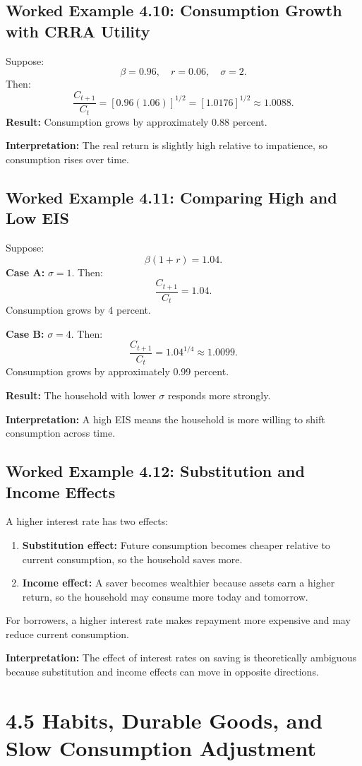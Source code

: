 \documentclass[12pt,a4paper]{article}
\begin{document}
\subsection*{Worked Example 4.10: Consumption Growth with CRRA Utility}
Suppose:
\[ \beta = 0.96, \quad r = 0.06, \quad \sigma = 2. \]
Then:
\[ \frac{C_{t+1}}{C_t} = [0.96(1.06)]^{1/2} = [1.0176]^{1/2} \approx 1.0088. \]
\textbf{Result:} Consumption grows by approximately 0.88 percent.

\textbf{Interpretation:} The real return is slightly high relative to impatience, so consumption rises over time.

\subsection*{Worked Example 4.11: Comparing High and Low EIS}
Suppose:
\[ \beta(1+r) = 1.04. \]
\textbf{Case A:} $\sigma = 1$. Then:
\[ \frac{C_{t+1}}{C_t} = 1.04. \]
Consumption grows by 4 percent.

\textbf{Case B:} $\sigma = 4$. Then:
\[ \frac{C_{t+1}}{C_t} = 1.04^{1/4} \approx 1.0099. \]
Consumption grows by approximately 0.99 percent.

\textbf{Result:} The household with lower $\sigma$ responds more strongly.

\textbf{Interpretation:} A high EIS means the household is more willing to shift consumption across time.

\subsection*{Worked Example 4.12: Substitution and Income Effects}
A higher interest rate has two effects:
\begin{enumerate}
    \item \textbf{Substitution effect:} Future consumption becomes cheaper relative to current consumption, so the household saves more.
    \item \textbf{Income effect:} A saver becomes wealthier because assets earn a higher return, so the household may consume more today and tomorrow.
\end{enumerate}
For borrowers, a higher interest rate makes repayment more expensive and may reduce current consumption.

\textbf{Interpretation:} The effect of interest rates on saving is theoretically ambiguous because substitution and income effects can move in opposite directions.

\section*{4.5 Habits, Durable Goods, and Slow Consumption Adjustment}
\end{document}
